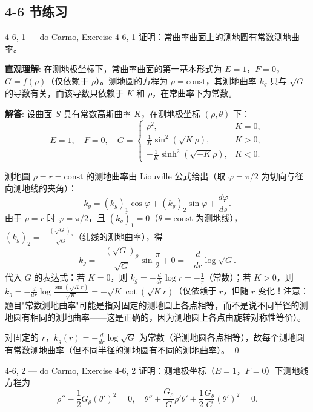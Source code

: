 \subsection*{4-6 节练习}

\begin{exercise}{4-6, 1 — do Carmo, Exercise 4-6, 1}
证明：常曲率曲面上的测地圆有常数测地曲率。
\end{exercise}

\begin{solution}
\textbf{直观理解}: 在测地极坐标下，常曲率曲面的第一基本形式为 $E=1$，$F=0$，$G = f(\rho)$（仅依赖于 $\rho$）。测地圆的方程为 $\rho = \mathrm{const}$，其测地曲率 $k_g$ 只与 $\sqrt{G}$ 的导数有关，而该导数只依赖于 $K$ 和 $\rho$，在常曲率下为常数。

\textbf{解答}: 设曲面 $S$ 具有常数高斯曲率 $K$，在测地极坐标 $(\rho,\theta)$ 下：
\[
E = 1,\quad F = 0,\quad G = \begin{cases}
\rho^2, & K = 0,\\
\frac{1}{K}\sin^2(\sqrt{K}\rho), & K > 0,\\
-\frac{1}{K}\sinh^2(\sqrt{-K}\rho), & K < 0.
\end{cases}
\]

测地圆 $\rho = r = \mathrm{const}$ 的测地曲率由 Liouville 公式给出（取 $\varphi = \pi/2$ 为切向与径向测地线的夹角）：
\[
k_g = (k_g)_1\cos\varphi + (k_g)_2\sin\varphi + \frac{d\varphi}{ds}.
\]
由于 $\rho = r$ 时 $\varphi = \pi/2$，且 $(k_g)_1 = 0$（$\theta = \mathrm{const}$ 为测地线），$(k_g)_2 = -\frac{(\sqrt{G})_\rho}{\sqrt{G}}$（纬线的测地曲率），得
\[
k_g = -\frac{(\sqrt{G})_\rho}{\sqrt{G}}\sin\frac{\pi}{2} + 0 = -\frac{d}{dr}\log\sqrt{G}.
\]
代入 $G$ 的表达式：若 $K=0$，则 $k_g = -\frac{d}{dr}\log r = -\frac{1}{r}$（常数）；若 $K>0$，则 $k_g = -\frac{d}{dr}\log\frac{\sin(\sqrt{K}r)}{\sqrt{K}} = -\sqrt{K}\cot(\sqrt{K}r)$（仅依赖于 $r$，但随 $r$ 变化！注意：题目"常数测地曲率"可能是指对固定的测地圆上各点相等，而不是说不同半径的测地圆有相同的测地曲率——这是正确的，因为测地圆上各点由旋转对称性等价）。

对固定的 $r$，$k_g(r) = -\frac{d}{dr}\log\sqrt{G}$ 为常数（沿测地圆各点相等），故每个测地圆有常数测地曲率（但不同半径的测地圆有不同的测地曲率）。
\qed
\end{solution}

\begin{exercise}{4-6, 2 — do Carmo, Exercise 4-6, 2}
证明：测地极坐标（$E=1$，$F=0$）下测地线方程为
\[
\rho'' - \frac{1}{2}G_\rho(\theta')^2 = 0,\quad
\theta'' + \frac{G_\rho}{G}\rho'\theta' + \frac{1}{2}\frac{G_\theta}{G}(\theta')^2 = 0.
\]
\end{exercise}

